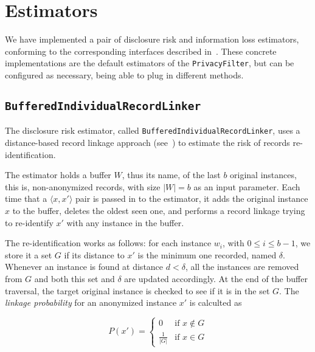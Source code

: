 \section{Estimators}
\label{Implementation:Estimators}

We have implemented a pair of disclosure risk and information loss estimators, conforming to the corresponding interfaces described in~. These concrete implementations are the default estimators of the \texttt{PrivacyFilter}, but can be configured as necessary, being able to plug in different methods.

\subsection{\texttt{BufferedIndividualRecordLinker}}
\label{Implementation:Estimators:RecordLinker}

The disclosure risk estimator, called \texttt{BufferedIndividualRecordLinker}, uses a distance-based record linkage approach (see~) to estimate the risk of records re-identification.

The estimator holds a buffer $W$, thus its name, of the last $b$ original instances, this is, non-anonymized records, with size $\vert W \vert = b$ as an input parameter. Each time that a $\langle x, x' \rangle$ pair is passed in to the estimator, it adds the original instance $x$ to the buffer, deletes the oldest seen one, and performs a record linkage trying to re-identify $x'$ with any instance in the buffer.

The re-identification works as follows: for each instance $w_i$, with $0 \leq i \leq b-1$, we store it a set $G$ if its distance to $x'$ is the minimum one recorded, named $\delta$. Whenever an instance is found at distance $d < \delta$, all the instances are removed from $G$ and both this set and $\delta$ are updated accordingly. At the end of the buffer traversal, the target original instance is checked to see if it is in the set $G$. The \textit{linkage probability} for an anonymized instance $x'$ is calculted as

\begin{equation}
P(x') =
\begin{cases}
0                       & \text{if } x \notin G \\
\frac{1}{\vert G \vert} & \text{if } x \in G
\end{cases}
\end{equation}

